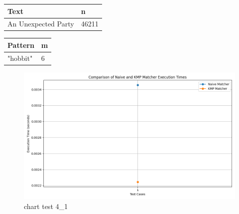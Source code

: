 \documentclass[11pt]{article}
\begin{document}
                \begin{table}[!htb]
                        \begin{minipage}{.5\linewidth}
                            \centering
                                \begin{tabular}{ll}
                                    \textbf{Text} & \textbf{n} \\
                                    \hline
                                    An Unexpected Party & 46211 \\
                                \end{tabular}
                        \end{minipage}%
                        \begin{minipage}{.5\linewidth}
                            \centering
                                \begin{tabular}{ll}
                                    \textbf{Pattern} & \textbf{m} \\
                                    \hline
                                    "hobbit" & 6 \\
                                \end{tabular}
                        \end{minipage}
                    \label{tab:test_4_1}
                \end{table}

                \begin{figure}[H]
                    \centering
                    \includegraphics[width = \textwidth]{execution_times_4_1}
                    \caption{chart test 4\_1}
                    \label{fig:chart_test_4_1}
                \end{figure}
\end{document}
